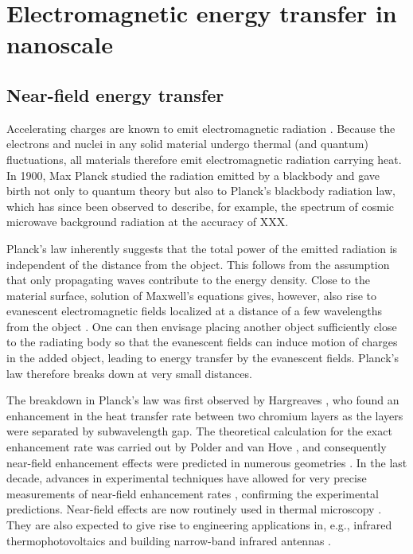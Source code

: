 

\section{Electromagnetic energy transfer in nanoscale}

\subsection{Near-field energy transfer}
Accelerating charges are known to emit electromagnetic radiation \cite{}. Because the electrons and nuclei in any solid material undergo thermal (and quantum) fluctuations, all materials therefore emit electromagnetic radiation carrying heat. In 1900, Max Planck \cite{planck00a} studied the radiation emitted by a blackbody and gave birth not only to quantum theory but also to Planck's blackbody radiation law, which has since been observed to describe, for example, the spectrum of cosmic microwave background radiation at the accuracy of XXX.

Planck's law inherently suggests that the total power of the emitted radiation is independent of the distance from the object. This follows from the assumption that only propagating waves contribute to the energy density. Close to the material surface, solution of Maxwell's equations gives, however, also rise to evanescent electromagnetic fields localized at a distance of a few wavelengths from the object \cite{polder71}. One can then envisage placing another object sufficiently close to the radiating body so that the evanescent fields can induce motion of charges in the added object, leading to energy transfer by the evanescent fields. Planck's law therefore breaks down at very small distances. 

The breakdown in Planck's law was first observed by Hargreaves \cite{hargreaves69}, who found an enhancement in the heat transfer rate between two chromium layers as the layers were separated by subwavelength gap. The theoretical calculation for the exact enhancement rate was carried out by Polder and van Hove \cite{polder71}, and consequently near-field enhancement effects were predicted in numerous geometries \cite{loomis94,pendry99,carminati99,shchegrov00,mulet01,volokitin01}. In the last decade, advances in experimental techniques have allowed for very precise measurements of near-field enhancement rates \cite{}, confirming the experimental predictions. Near-field effects are now routinely used in thermal microscopy \cite{majumdar99,muller-hirsch99,kittel05,kittel08}. They are also expected to give rise to engineering applications in, e.g., infrared thermophotovoltaics \cite{dimatteo01,narayanaswamy03,laroche06} and building narrow-band infrared antennas \cite{greffet02}. 


